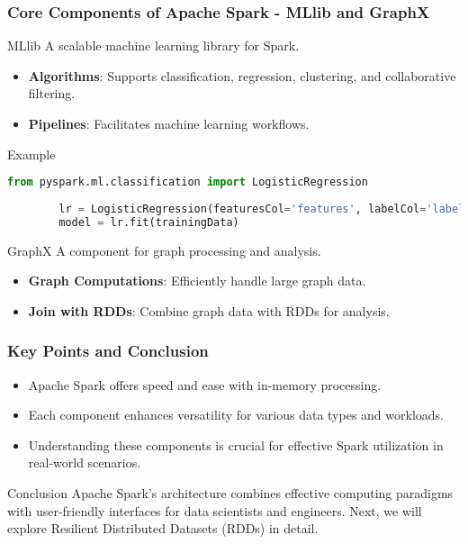 \documentclass[aspectratio=169]{beamer}
\begin{document}
\begin{frame}[fragile]
    \frametitle{Core Components of Apache Spark - MLlib and GraphX}
    \begin{block}{MLlib}
        A scalable machine learning library for Spark.
    \end{block}
    \begin{itemize}
        \item \textbf{Algorithms}: Supports classification, regression, clustering, and collaborative filtering.
        \item \textbf{Pipelines}: Facilitates machine learning workflows.
    \end{itemize}
    \begin{block}{Example}
        \begin{lstlisting}[language=Python]
        from pyspark.ml.classification import LogisticRegression
        
        lr = LogisticRegression(featuresCol='features', labelCol='label')
        model = lr.fit(trainingData)
        \end{lstlisting}
    \end{block}

    \begin{block}{GraphX}
        A component for graph processing and analysis.
    \end{block}
    \begin{itemize}
        \item \textbf{Graph Computations}: Efficiently handle large graph data.
        \item \textbf{Join with RDDs}: Combine graph data with RDDs for analysis.
    \end{itemize}
\end{frame}

\begin{frame}[fragile]
    \frametitle{Key Points and Conclusion}
    \begin{itemize}
        \item Apache Spark offers speed and ease with in-memory processing.
        \item Each component enhances versatility for various data types and workloads.
        \item Understanding these components is crucial for effective Spark utilization in real-world scenarios.
    \end{itemize}
    \begin{block}{Conclusion}
        Apache Spark's architecture combines effective computing paradigms with user-friendly interfaces for data scientists and engineers. Next, we will explore Resilient Distributed Datasets (RDDs) in detail.
    \end{block}
\end{frame}
\end{document}
